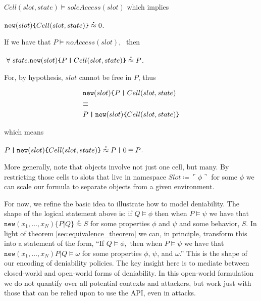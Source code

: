 \documentclass[]{acm_proc_article-sp}
\newcommand{\lpquote}{\ulcorner}
\newcommand{\rpquote}{\urcorner}
\newcommand{\id}[1]{\texttt{#1}}
\newcommand{\juxtap}{\mathbin{\id{|}}}
\newcommand{\scong}{\mathbin{\equiv}}
\newcommand{\binpar}[2]{#1 \juxtap #2}
\newcommand{\defneqls}{\coloneqq}
\newcommand{\wbbisim}{\stackrel{\centerdot}{\approx}} %
\newcommand{\pquotep}[1]{\lpquote #1 \rpquote}
\numberwithin{equation}{subsection}
\begin{document}
$Cell (slot, state) \models soleAccess( slot )$ which implies

${\mbox{\tt new}(slot)\mbox{\tt \{} Cell(slot, state) \mbox{\tt \}}}
\wbbisim 0$.

If we have that $P \models noAccess( slot ), \;$ then 

$\; \forall \; state . \mbox{\tt new}(slot)\mbox{\tt \{}
\binpar{P}{Cell(slot, state)} \mbox{\tt \}}\wbbisim P$.

For, by hypothesis, $slot$ cannot be free in $P$, thus

\begin{equation*}
  \begin{aligned}
    & \mbox{\tt new}(slot)\mbox{\tt \{} \binpar{P}{Cell(slot, state)} \\
    & \scong \\
    & \binpar{P}{\mbox{\tt new}(slot)\mbox{\tt \{} Cell(slot, state) \mbox{\tt \}}} \\
  \end{aligned}
\end{equation*}

\noindent which means

$\binpar{P}{\mbox{\tt new}(slot)\mbox{\tt \{} Cell(slot, state)
  \mbox{\tt \}}} \wbbisim \binpar{P}{0} \scong P$.

More generally, note that objects involve not just one cell, but
many. By restricting those cells to slots that live in namespace $Slot
\defneqls \pquotep{\phi}$ for some $\phi$ we can scale our formula to
separate objects from a given environment. 

For now, we refine the basic idea to illustrate how to model
deniability. The shape of the logical statement above is: if $Q
\models \phi$ then when $P \models \psi$ we have that
$\texttt{new}(x_1,\ldots,x_N)\{ \binpar{P}{Q} \} \wbbisim S$ for some
properties $\phi$ and $\psi$ and some behavior, $S$. In light of
theorem \ref{sec:equivalence_theorem} we can, in principle, transform
this into a statement of the form, ``If $Q \models \phi,$ then when $P
\models \psi$ we have that $\texttt{new}(x_1,\ldots,x_N)\binpar{P}{Q}
\models \omega$ for some properties $\phi$, $\psi$, and $\omega$.'' This
is the shape of our encoding of deniability policies. The key insight
here is to mediate between closed-world and open-world forms of
deniability. In this open-world formulation we do not quantify over
all potential contexts and attackers, but work just with those that
can be relied upon to use the API, even in attacks.
\end{document}
